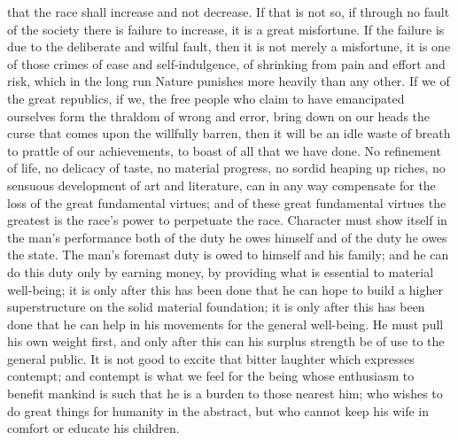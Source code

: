 \documentclass{scrbook}
\begin{document}
that the race shall increase and not decrease. If that is not so, if through no fault of the
society there is failure to increase, it is a great misfortune. If the failure is due to the
deliberate and wilful fault, then it is not merely a misfortune, it is one of those crimes of
ease and self-indulgence, of shrinking from pain and effort and risk, which in the long run
Nature punishes more heavily than any other. If we of the great republics, if we, the free
people who claim to have emancipated ourselves form the thraldom of wrong and error,
bring down on our heads the curse that comes upon the willfully barren, then it will be an
idle waste of breath to prattle of our achievements, to boast of all that we have done. No
refinement of life, no delicacy of taste, no material progress, no sordid heaping up riches,
no sensuous development of art and literature, can in any way compensate for the loss of
the great fundamental virtues; and of these great fundamental virtues the greatest is the
race’s power to perpetuate the race. Character must show itself in the man’s performance
both of the duty he owes himself and of the duty he owes the state. The man’s foremast
duty is owed to himself and his family; and he can do this duty only by earning money,
by providing what is essential to material well-being; it is only after this has been done
that he can hope to build a higher superstructure on the solid material foundation; it is only
after this has been done that he can help in his movements for the general well-being. He
must pull his own weight first, and only after this can his surplus strength be of use to the
general public. It is not good to excite that bitter laughter which expresses contempt; and
contempt is what we feel for the being whose enthusiasm to benefit mankind is such that he
is a burden to those nearest him; who wishes to do great things for humanity in the abstract,
but who cannot keep his wife in comfort or educate his children.
\end{document}
